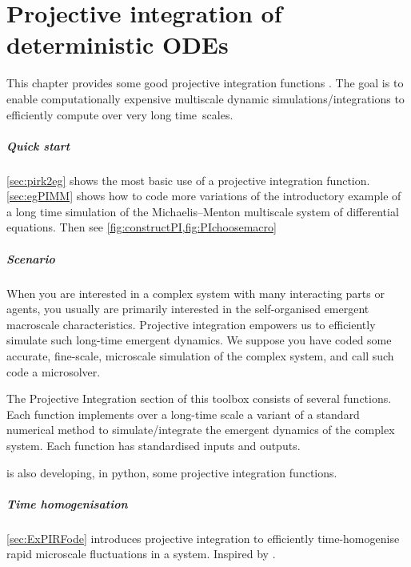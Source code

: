 \chapter{Projective integration of deterministic ODEs}
\label{sec:ProjInt}
\localtableofcontents



This chapter provides some good projective integration functions \cite[e.g.]{Gear02b, Gear03c, Givon06, Marschler2014b, Maclean2015, Sieber2018}.
The goal is to enable computationally expensive multiscale dynamic simulations\slash integrations to efficiently compute over very long time~scales.

\paragraph{Quick start} 
\cref{sec:pirk2eg} shows the most basic use of a projective integration function.
\cref{sec:egPIMM} shows how to code more variations of the introductory example of a long time simulation of the Michaelis--Menton multiscale system of differential equations.
Then see \cref{fig:constructPI,fig:PIchoosemacro}

\paragraph{Scenario}
When you are interested in a complex system with many interacting parts or agents, you usually are primarily interested in the self-organised emergent macroscale characteristics.
Projective integration empowers us to efficiently simulate such long-time emergent dynamics.
We suppose you have coded some accurate, fine-scale, microscale simulation of the complex system, and call such code a microsolver.

The Projective Integration section of this toolbox consists of several functions.
Each function implements over a long-time scale a variant of a standard numerical method to simulate\slash integrate the emergent dynamics of the complex system.
Each function has standardised inputs and outputs.

\cite{Petersik2019} is also developing, in python, some projective integration functions.


\paragraph{Time homogenisation}
\cref{sec:ExPIRFode} introduces projective integration to efficiently time-homogenise rapid microscale fluctuations in a system.  
Inspired by \cite{Bunder2013a, vonOertzen2026}.


